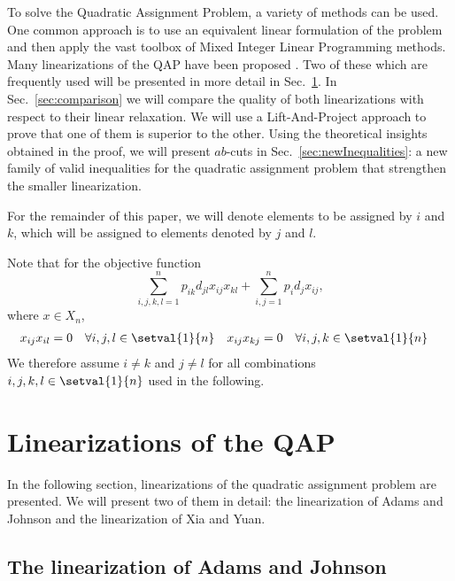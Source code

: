 To solve the Quadratic Assignment Problem, a variety of methods can be used. One common approach is to use an equivalent linear formulation of the problem and then apply the vast toolbox of Mixed Integer Linear Programming methods. Many linearizations of the QAP have been proposed \cite{MR1290346,MR2238659,KAUFMAN1978207,MR3084089,MR2913063,MR2314426}. Two of these which are frequently used will be presented in more detail in Sec.~\ref{sec:linearizations}. In Sec.~\ref{sec:comparison} we will compare the quality of both linearizations with respect to their linear relaxation. We will use a Lift-And-Project approach to prove that one of them is superior to the other. Using the theoretical insights obtained in the proof, we will present $ab$-cuts in Sec.~\ref{sec:newInequalities}: a new family of valid inequalities for the quadratic assignment problem that strengthen the smaller linearization.

\begin{remark}[Notation]
	For the remainder of this paper, we will denote elements to be assigned by $i$ and $k$, which will be assigned to elements denoted by $j$ and $l$.
\end{remark}

\begin{remark}
	Note that for the objective function 	
	\begin{equation*}
		\sum_{i,j,k,l = 1}^n p_{ik}d_{jl}x_{ij}x_{kl} +\sum_{i,j = 1}^np_id_jx_{ij},
	\end{equation*}
	where $x\in X_n$, 
	\begin{align*}
		x_{ij}x_{il} &= 0\quad\forall i,j,l\in\setval{1}{n}&
		x_{ij}x_{kj} &= 0\quad\forall i,j,k\in\setval{1}{n}
	\end{align*}
	We therefore assume $i\neq k$ and $j\neq l$ for all combinations $i,j,k,l \in\setval{1}{n}$ used in the following.
\end{remark}

\section{Linearizations of the QAP}
\label{sec:linearizations}
In the following section, linearizations of the quadratic assignment problem are presented. We will present two of them in detail: the linearization of Adams and Johnson and the linearization of Xia and Yuan. 

\subsection{The linearization of Adams and Johnson}

